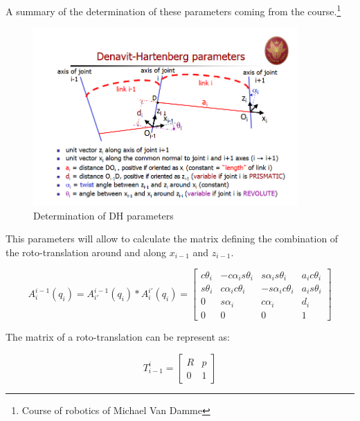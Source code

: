 A summary of the determination of these parameters coming from the course.\footnote{Course of robotics of Michael Van Damme}

\begin{figure}[h!]
	\centering
    \includegraphics[width = 0.9\textwidth]{Images/DHparameters}
    \caption{Determination of DH parameters}
    \label{fig:DH}
\end{figure}

This parameters will allow to calculate the matrix defining the combination of the roto-translation around and along $x_{i-1}$ and $z_{i-1}$. \\

\begin{center}
	\begin{equation}
		A^{i-1}_{i}(q_i) = A^{i-1}_{i'}(q_i) * A^{i'}_{i}(q_i) = \begin{bmatrix}
		c\theta_i & -c\alpha_is\theta_i & s\alpha_is\theta_i & a_ic\theta_i \\
        s\theta_i & c\alpha_ic\theta_i & -s\alpha_ic\theta_i & a_is\theta_i \\
        0 & s \alpha_i & c \alpha_i & d_i\\
        0 & 0 & 0 & 1
		\end{bmatrix}
	\end{equation}
\end{center}


The matrix of a roto-translation can be represent as: \\
\begin{center}
	 \begin{equation}
	 	T^i_{i-1} = \begin{bmatrix}
	 	R & p\\ 0 & 1
	 	\end{bmatrix}
	 \end{equation}
\end{center}

